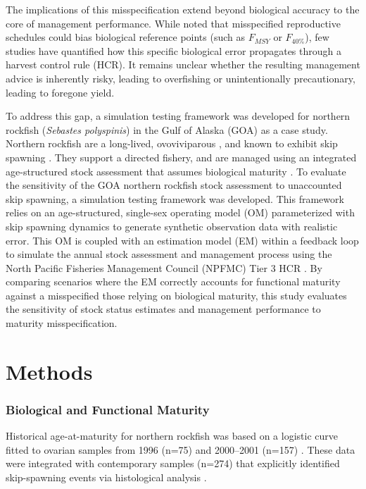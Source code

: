 \documentclass[
  authoryear,
  preprint,
  3p]{elsarticle}
\begin{document}
The implications of this misspecification extend beyond biological
accuracy to the core of management performance. While \citet{Secor2008}
noted that misspecified reproductive schedules could bias biological
reference points (such as \(F_{MSY}\) or \(F_{40\%}\)), few studies have
quantified how this specific biological error propagates through a
harvest control rule (HCR). It remains unclear whether the resulting
management advice is inherently risky, leading to overfishing or
unintentionally precautionary, leading to foregone yield.

To address this gap, a simulation testing framework was developed for
northern rockfish (\emph{Sebastes polyspinis}) in the Gulf of Alaska
(GOA) as a case study. Northern rockfish are a long-lived, ovoviviparous
\citep{Kendall1987}, and known to exhibit skip spawning
\citep{Conrath2019}. They support a directed fishery, and are managed
using an integrated age-structured stock assessment that assumes
biological maturity \citep{Williams2023}. To evaluate the sensitivity of
the GOA northern rockfish stock assessment to unaccounted skip spawning,
a simulation testing framework was developed. This framework relies on
an age-structured, single-sex operating model (OM) parameterized with
skip spawning dynamics to generate synthetic observation data with
realistic error. This OM is coupled with an estimation model (EM) within
a feedback loop to simulate the annual stock assessment and management
process using the North Pacific Fisheries Management Council (NPFMC)
Tier 3 HCR \citep{Dorn2020}. By comparing scenarios where the EM
correctly accounts for functional maturity against a misspecified those
relying on biological maturity, this study evaluates the sensitivity of
stock status estimates and management performance to maturity
misspecification.

\section{Methods}\label{methods}

\subsubsection{Biological and Functional
Maturity}\label{biological-and-functional-maturity}

Historical age-at-maturity for northern rockfish was based on a logistic
curve fitted to ovarian samples from 1996 (n=75) and 2000--2001 (n=157)
\citep{Heifetz2003, Chilton2007}. These data were integrated with
contemporary samples (n=274) that explicitly identified skip-spawning
events via histological analysis \citep{Conrath2019}.
\end{document}
